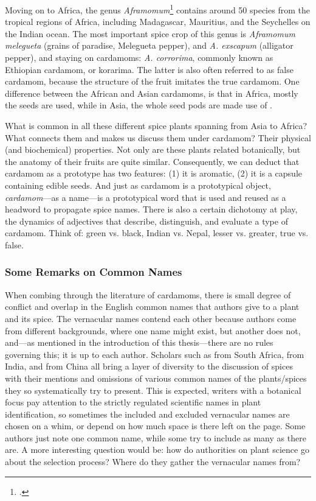 Moving on to Africa, the genus \textit{Aframomum}\footcite[Aframomum K.Schum. ]{gbif} contains around 50 species from the tropical regions of Africa, including Madagascar, Mauritius, and the Seychelles on the Indian ocean. The most important spice crop of this genus is \textit{Aframomum melegueta} (grains of paradise, Melegueta pepper), and \textit{A. exscapum} (alligator pepper), and staying on cardamoms: \textit{A. corrorima}, commonly known as Ethiopian cardamom, or korarima. The latter is also often referred to as false cardamom, because the structure of the fruit imitates the true cardamom. One difference between the African and Asian cardamoms, is that in Africa, mostly the seeds are used, while in Asia, the whole seed pods are made use of \autocite{van_wyk_culinary_2014}.



What is common in all these different spice plants spanning from Asia to Africa? What connects them and makes us discuss them under cardamom? Their physical (and biochemical) properties. Not only are these plants related botanically, but the anatomy of their fruits are quite similar. Consequently, we can deduct that cardamom as a prototype has two features: (1) it is aromatic, (2) it is a capsule containing edible seeds. And just as cardamom is a prototypical object, \textit{cardamom}---as a name---is a prototypical word that is used and reused as a headword to propagate spice names. There is also a certain dichotomy at play, the dynamics of adjectives that describe, distinguish, and evaluate a type of cardamom. Think of: green vs. black, Indian vs. Nepal, lesser vs. greater, true vs. false.

\subsubsection{Some Remarks on Common Names}

When combing through the literature of cardamoms, there is small degree of conflict and overlap in the English common names that authors give to a plant and its spice. The vernacular names contend each other because authors come from different backgrounds, where one name might exist, but another does not, and---as mentioned in the introduction of this thesis---there are no rules governing this; it is up to each author. Scholars such as \citeauthor{van_wyk_culinary_2014} from South Africa, \citeauthor{ravindran_cardamom_2002} from India, and \citeauthor{hu_food_2005} from China all bring a layer of diversity to the discussion of spices with their mentions and omissions of various common names of the plants/spices they so systematically try to present. This is expected, writers with a botanical focus pay attention to the strictly regulated scientific names in plant identification, so sometimes the included and excluded vernacular names are chosen on a whim, or depend on how much space is there left on the page. Some authors just note one common name, while some try to include as many as there are. A more interesting question would be: how do authorities on plant science go about the selection process? Where do they gather the vernacular names from?

